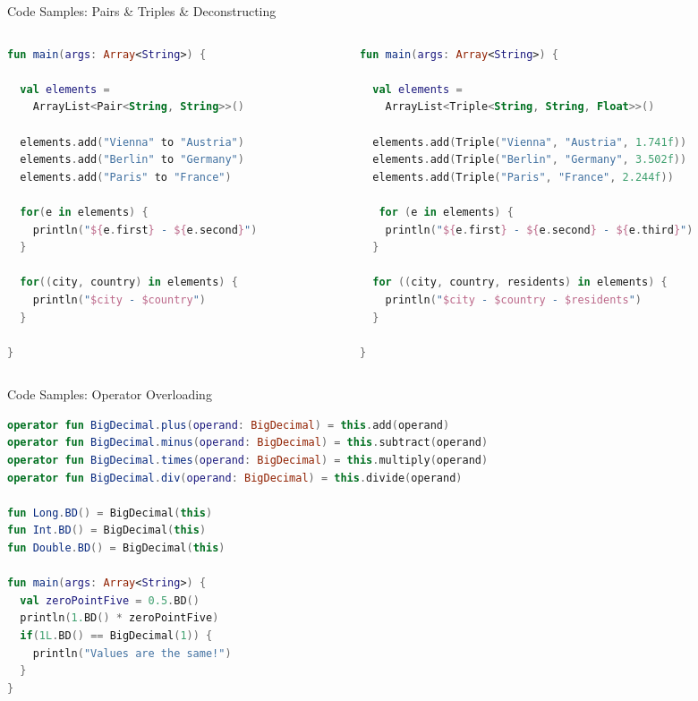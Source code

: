 \begin{frame}[fragile]{Code Samples: Pairs \& Triples \& Deconstructing}
	\begin{columns}
		\begin{column}{0.5\textwidth}
\begin{lstlisting}[language=Kotlin,basicstyle=\ttfamily\tiny]
fun main(args: Array<String>) {

  val elements =
    ArrayList<Pair<String, String>>()

  elements.add("Vienna" to "Austria")
  elements.add("Berlin" to "Germany")
  elements.add("Paris" to "France")

  for(e in elements) {
    println("${e.first} - ${e.second}")
  }

  for((city, country) in elements) {
    println("$city - $country")
  }

}
\end{lstlisting}
		\end{column}
		\begin{column}{0.5\textwidth}
\begin{lstlisting}[language=Kotlin,basicstyle=\ttfamily\tiny]
fun main(args: Array<String>) {

  val elements =
    ArrayList<Triple<String, String, Float>>()

  elements.add(Triple("Vienna", "Austria", 1.741f))
  elements.add(Triple("Berlin", "Germany", 3.502f))
  elements.add(Triple("Paris", "France", 2.244f))

   for (e in elements) {
    println("${e.first} - ${e.second} - ${e.third}")
  }

  for ((city, country, residents) in elements) {
    println("$city - $country - $residents")
  }

}
\end{lstlisting}
		\end{column}
	\end{columns}
\end{frame}

\begin{frame}[fragile]{Code Samples: Operator Overloading}
\begin{lstlisting}[language=Kotlin,basicstyle=\ttfamily\tiny]
operator fun BigDecimal.plus(operand: BigDecimal) = this.add(operand)
operator fun BigDecimal.minus(operand: BigDecimal) = this.subtract(operand)
operator fun BigDecimal.times(operand: BigDecimal) = this.multiply(operand)
operator fun BigDecimal.div(operand: BigDecimal) = this.divide(operand)

fun Long.BD() = BigDecimal(this)
fun Int.BD() = BigDecimal(this)
fun Double.BD() = BigDecimal(this)

fun main(args: Array<String>) {
  val zeroPointFive = 0.5.BD()
  println(1.BD() * zeroPointFive)
  if(1L.BD() == BigDecimal(1)) {
    println("Values are the same!")
  }
}
\end{lstlisting}
\end{frame}

